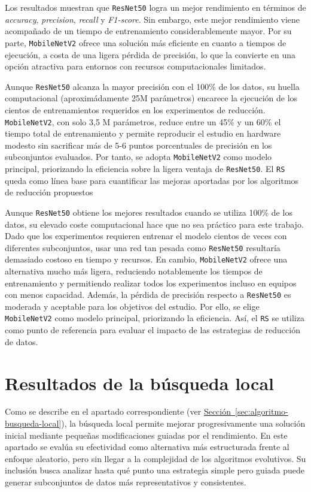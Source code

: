 Los resultados muestran que \texttt{ResNet50} logra un mejor rendimiento en términos de \textit{accuracy}, \textit{precision}, \textit{recall} y \textit{F1-score}.
Sin embargo, este mejor rendimiento viene acompañado de un tiempo de entrenamiento considerablemente mayor.
Por su parte, \texttt{MobileNetV2} ofrece una solución más eficiente en cuanto a tiempos de ejecución, a costa de una ligera pérdida de precisión,
lo que la convierte en una opción atractiva para entornos con recursos computacionales limitados.

Aunque \texttt{ResNet50} alcanza la mayor precisión con el 100\% de los datos, su huella computacional (aproximádamente 25M parámetros) encarece la ejecución de los cientos de entrenamientos requeridos en los experimentos de reducción.
\texttt{MobileNetV2}, con solo 3,5 M parámetros, reduce entre un 45\% y un 60\% el tiempo total de entrenamiento y 
permite reproducir el estudio en hardware modesto sin sacrificar más de 5-6 puntos porcentuales de precisión en los subconjuntos evaluados.
Por tanto, se adopta \texttt{MobileNetV2} como modelo principal, priorizando la eficiencia sobre la ligera ventaja de \texttt{ResNet50}.
El \texttt{RS} queda como línea base para cuantificar las mejoras aportadas por los algoritmos de reducción propuestos

Aunque \texttt{ResNet50} obtiene los mejores resultados cuando se utiliza 100\% de los datos, 
su elevado coste computacional hace que no sea práctico para este trabajo.
Dado que los experimentos requieren entrenar el modelo cientos de veces con diferentes subconjuntos, 
usar una red tan pesada como \texttt{ResNet50} resultaría demasiado costoso en tiempo y recursos.
En cambio, \texttt{MobileNetV2} ofrece una alternativa mucho más ligera, 
reduciendo notablemente los tiempos de entrenamiento y permitiendo realizar todos los experimentos incluso en equipos con menos capacidad.
Además, la pérdida de precisión respecto a \texttt{ResNet50} es moderada y aceptable para los objetivos del estudio.
Por ello, se elige \texttt{MobileNetV2} como modelo principal, priorizando la eficiencia.
Así, el \texttt{RS} se utiliza como punto de referencia para evaluar el impacto de las estrategias de reducción de datos.


\section{Resultados de la búsqueda local}\label{sec:resultados-busqueda-local}
Como se describe en el apartado correspondiente (ver \hyperref[sec:algoritmo-busqueda-local]{Sección~\ref*{sec:algoritmo-busqueda-local}}),
la búsqueda local permite mejorar progresivamente una solución inicial mediante pequeñas modificaciones guiadas por el rendimiento.
En este apartado se evalúa su efectividad como alternativa más estructurada frente al enfoque aleatorio, pero sin llegar a la complejidad de los algoritmos evolutivos.
Su inclusión busca analizar hasta qué punto una estrategia simple pero guiada puede generar subconjuntos de datos más representativos y consistentes.

